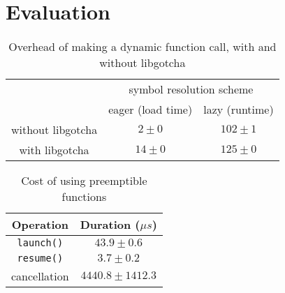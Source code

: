 \section{Evaluation}

\begin{table}
\begin{tabular}{c | c c}
& \multicolumn{2}{c}{symbol resolution scheme} \\
& eager (load time) & lazy (runtime) \\
\hline
without libgotcha & $2 \pm 0$ & $102 \pm 1$ \\
with libgotcha & $14 \pm 0$ & $125 \pm 0$
\end{tabular}
\caption{Overhead of making a dynamic function call, with and without libgotcha}
\end{table}


\begin{table}
\begin{center}
\begin{tabular}{c | c}
Operation & Duration ($\mu{s}$) \\
\hline
\texttt{launch()} & $43.9 \pm 0.6$ \\
\texttt{resume()} & $3.7 \pm 0.2$ \\
cancellation & $4440.8 \pm 1412.3$
\end{tabular}
\end{center}
\caption{Cost of using preemptible functions}
\end{table}
